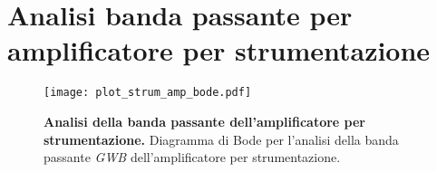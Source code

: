 \documentclass[
    rmp,
    reprint, 
    superscriptaddress, 
    altaffilletter, 
    amsmath, 
    amssymb,
    a4paper]{revtex4-2}
\begin{document}
\section{Analisi banda passante per amplificatore per strumentazione}

\renewcommand{\thetable}{C-\arabic{table}}
\renewcommand{\thefigure}{C-\arabic{figure}}

\begin{figure}[!h]
    \raggedright
    \texttt{[image: plot\_strum\_amp\_bode.pdf]}
    \caption{\textbf{Analisi della banda passante dell'amplificatore per strumentazione.} Diagramma di Bode per l'analisi della banda passante \emph{GWB} dell'amplificatore per strumentazione.}
    \label{fig:gbw_amp_strum}
\end{figure}
\end{document}
